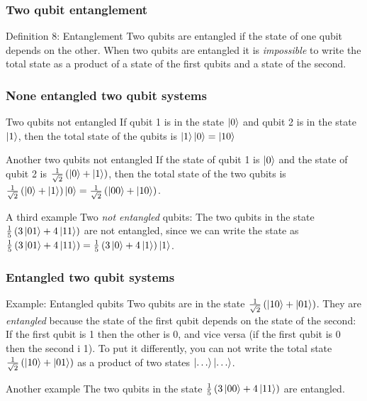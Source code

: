 \documentclass[10pt]{beamer}
\begin{document}
\begin{frame}
  \frametitle{Two qubit entanglement}
  \begin{block}{Definition 8: Entanglement}
  Two qubits are entangled if the state of one qubit depends on the other. When two qubits are entangled it is \textit{impossible} to write the total state as a product of a state of the first qubits and a state of the second.
  \end{block}
\end{frame}

\begin{frame}
  \frametitle{None entangled two qubit systems}
  \begin{block}{Two qubits not entangled}
    If qubit 1 is in the state $\ket{0}$ and qubit 2 is in the state $\ket{1}$, then the total state of the qubits is $\ket{1}\ket{0} = \ket{10}$
  \end{block}
  \begin{block}{Another two qubits not entangled}
    If the state of qubit 1 is $\ket{0}$ and the state of qubit 2 is $\frac{1}{\sqrt{2}}\left( \ket{0}+\ket{1} \right)$, then the total state of the two qubits is $\frac{1}{\sqrt{2}}\left( \ket{0}+\ket{1} \right)\ket{0}=\frac{1}{\sqrt{2}}\left( \ket{00}+\ket{10} \right)$.
  \end{block}

  \begin{block}{A third example}
    Two \emph{not entangled} qubits: The two qubits in the state $\frac{1}{5}\left( 3 \ket{01}+4 \ket{11} \right)$ are not entangled, since we can write the state as $\frac{1}{5}\left( 3 \ket{01}+4 \ket{11} \right)= \frac{1}{5}\left( 3 \ket{0}+4 \ket{1} \right)\ket{1}$.
  \end{block}
\end{frame}

\begin{frame}
  \frametitle{Entangled two qubit systems}
  \begin{block}{Example: Entangled qubits}
    Two qubits are in the state $\frac{1}{\sqrt{2}}\left( \ket{10}+\ket{01} \right)$. They are \emph{entangled} because the state of the first qubit depends on the state of the second: If the first qubit is 1 then the other is 0, and vice versa (if the first qubit is 0 then the second i 1). To put it differently, you can not write the total state $\frac{1}{\sqrt{2}}\left( \ket{10}+\ket{01} \right)$ as a product of two states $\ket{\dots}\ket{\dots}$.
  \end{block}

  \begin{block}{Another example}
    The two qubits in the state $\frac{1}{5}\left( 3\ket{00}+4 \ket{11} \right)$ are entangled.
  \end{block}
\end{frame}
\end{document}
